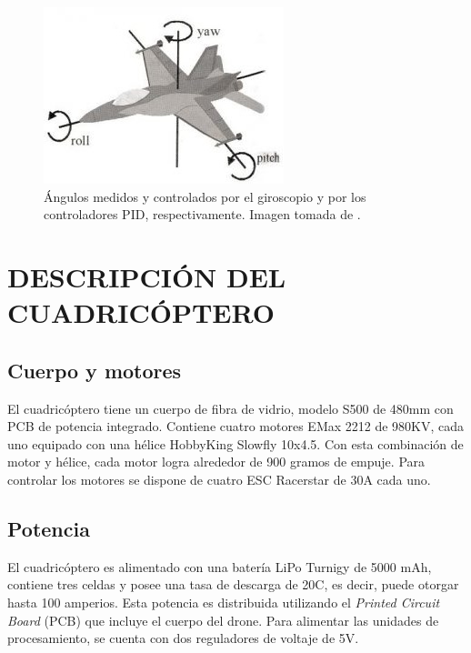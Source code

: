 \documentclass[letterpaper, 10 pt, conference]{ieeeconf}  %
\begin{document}
\begin{figure}[htpb]
	\centering
	\includegraphics[width=0.99\columnwidth]{angles.jpg}
	\caption{Ángulos medidos y controlados por el giroscopio y por los controladores PID, respectivamente. Imagen tomada de \cite{ypr}.}
	\label{yaw_pitch_roll}
\end{figure}

\section{DESCRIPCIÓN DEL CUADRICÓPTERO}
\subsection{Cuerpo y motores}
El cuadricóptero tiene un cuerpo de fibra de vidrio, modelo S500 de 480mm con PCB de potencia integrado. Contiene cuatro motores EMax 2212 de 980KV, cada uno equipado con una hélice HobbyKing Slowfly 10x4.5. Con esta combinación de motor y hélice, cada motor logra alrededor de 900 gramos de empuje. Para controlar los motores se dispone de cuatro ESC Racerstar de 30A cada uno. 

\subsection{Potencia}
El cuadricóptero es alimentado con una batería LiPo Turnigy de 5000 mAh, contiene tres celdas y posee una tasa de descarga de 20C, es decir, puede otorgar hasta 100 amperios. Esta potencia es distribuida utilizando el \textit{Printed Circuit Board} (PCB) que incluye el cuerpo del drone. Para alimentar las unidades de procesamiento, se cuenta con dos reguladores de voltaje de 5V.
\end{document}
